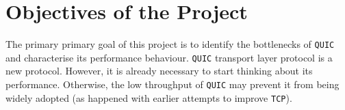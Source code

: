 \documentclass[12pt,a4paper,twoside,openright]{report}
\begin{document}
\section{Objectives of the Project}

The primary primary goal of this project is to identify the bottlenecks of \texttt{QUIC} and characterise its performance behaviour.
\texttt{QUIC} transport layer protocol is a new protocol.
However, it is already necessary to start thinking about its performance.
Otherwise, the low throughput of \texttt{QUIC} may prevent it from being widely adopted (as happened with earlier attempts to improve \texttt{TCP}). 










 
\end{document}
